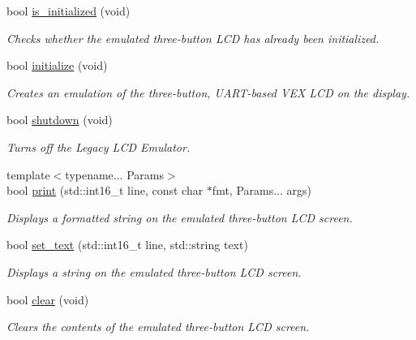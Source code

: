 \begin{DoxyCompactItemize}
\item 
bool \hyperlink{namespacepros_1_1lcd_a867eb9cd989e1c6c31982fe2b5c58dd9}{is\+\_\+initialized} (void)
\begin{DoxyCompactList}\small\item\em Checks whether the emulated three-\/button L\+CD has already been initialized. \end{DoxyCompactList}\item 
bool \hyperlink{namespacepros_1_1lcd_afb69bfa2fc5da3018b6886f612ed190e}{initialize} (void)
\begin{DoxyCompactList}\small\item\em Creates an emulation of the three-\/button, U\+A\+R\+T-\/based V\+EX L\+CD on the display. \end{DoxyCompactList}\item 
bool \hyperlink{namespacepros_1_1lcd_a7aa9a422049011de193f54bce8cc95ed}{shutdown} (void)
\begin{DoxyCompactList}\small\item\em Turns off the Legacy L\+CD Emulator. \end{DoxyCompactList}\item 
{\footnotesize template$<$typename... Params$>$ }\\bool \hyperlink{namespacepros_1_1lcd_aead67d10b420308d58883135f0d28099}{print} (std\+::int16\+\_\+t line, const char $\ast$fmt, Params... args)
\begin{DoxyCompactList}\small\item\em Displays a formatted string on the emulated three-\/button L\+CD screen. \end{DoxyCompactList}\item 
bool \hyperlink{namespacepros_1_1lcd_a515526f1d3069a6aa985512273aa7788}{set\+\_\+text} (std\+::int16\+\_\+t line, std\+::string text)
\begin{DoxyCompactList}\small\item\em Displays a string on the emulated three-\/button L\+CD screen. \end{DoxyCompactList}\item 
bool \hyperlink{namespacepros_1_1lcd_a8d22379bd680a36182d51d8e8ef02baf}{clear} (void)
\begin{DoxyCompactList}\small\item\em Clears the contents of the emulated three-\/button L\+CD screen. \end{DoxyCompactList}\item 

\end{DoxyCompactItemize}
